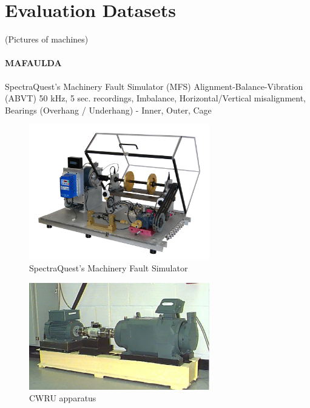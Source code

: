 \section{Evaluation Datasets}
(Pictures of machines)

\paragraph{MAFAULDA}
SpectraQuest's Machinery Fault Simulator (MFS) Alignment-Balance-Vibration (ABVT)
50 kHz, 5 sec. recordings, Imbalance, Horizontal/Vertical misalignment, Bearings (Overhang / Underhang) - Inner, Outer, Cage

\cite{noauthor_mafaulda_nodate}
\begin{figure}[h]
\centering
\includegraphics[width=0.7\textwidth]{assets/mafaulda-simulator.jpg}
\caption{SpectraQuest's Machinery Fault Simulator}
\label{fig:mafaulda-simulator}
\end{figure}

\begin{figure}[h]
\centering
\includegraphics[width=0.7\textwidth]{assets/cwru-test-stand.jpg}
\caption{CWRU apparatus}
\label{fig:mafaulda-simulator}
\end{figure}

